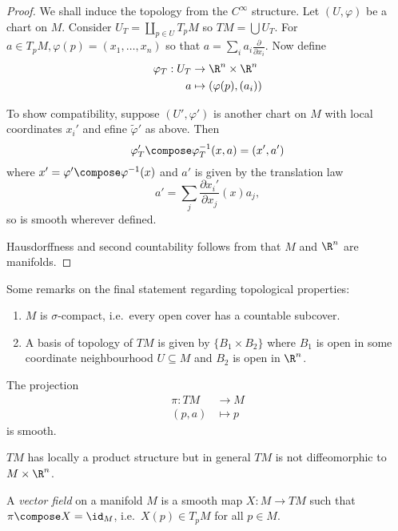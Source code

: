 \documentclass[a4paper]{article}
\begin{document}
\begin{proof}
  We shall induce the topology from the \(C^\infty\) structure. Let \((U, \varphi)\) be a chart on \(M\). Consider \(U_T = \coprod_{p \in U} T_pM\) so \(TM = \bigcup U_T\). For \(a \in T_pM, \varphi(p) = (x_1, \dots, x_n)\) so that \(a = \sum_i a_i \frac{\partial  }{\partial x_i}\). Now define
  \begin{align*}
    \varphi_T: U_T &\to \R^n \times \R^n \\
    a &\mapsto (\varphi(p), (a_i))
  \end{align*}

  To show compatibility, suppose \((U', \varphi')\) is another chart on \(M\) with local coordinates \(x_i'\) and efine \(\tilde \varphi'\) as above. Then
  \[
    \varphi_T' \compose \varphi_T^{-1}(x, a)
    = (x', a')
  \]
  where \(x' = \varphi' \compose \varphi^{-1}(x)\) and \(a'\) is given by the translation law
  \[
    a' = \sum_j \frac{\partial x_i'}{\partial x_j} (x) a_j,
  \]
  so is smooth wherever defined.

  Hausdorffness and second countability follows from that \(M\) and \(\R^n\) are manifolds.
\end{proof}

\begin{note}
  Some remarks on the final statement regarding topological properties:
  \begin{enumerate}
  \item \(M\) is \(\sigma\)-compact, i.e.\ every open cover has a countable subcover.
  \item A basis of topology of \(TM\) is given by \(\{B_1 \times B_2\}\) where \(B_1\) is open in some coordinate neighbourhood \(U \subseteq M\) and \(B_2\) is open in \(\R^n\).
  \end{enumerate}
\end{note}

\begin{corollary}
  The projection
  \begin{align*}
    \pi: TM &\to M \\
    (p, a) &\mapsto p
  \end{align*}
  is smooth.
\end{corollary}

\begin{remark}
  \(TM\) has locally a product structure but in general \(TM\) is not diffeomorphic to \(M \times \R^n\).
\end{remark}

\begin{definition}
  A \emph{vector field} on a manifold \(M\) is a smooth map \(X: M \to TM\) such that \(\pi \compose X = \id_M\), i.e.\ \(X(p) \in T_pM\) for all \(p \in M\).
\end{definition}
\end{document}
